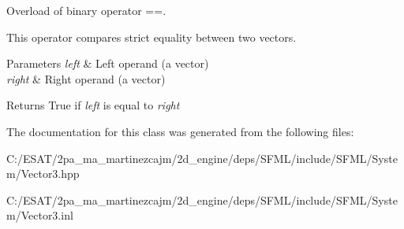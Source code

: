Overload of binary operator ==. 

This operator compares strict equality between two vectors.


\begin{DoxyParams}{Parameters}
{\em left} & Left operand (a vector) \\
\hline
{\em right} & Right operand (a vector)\\
\hline
\end{DoxyParams}
\begin{DoxyReturn}{Returns}
True if {\itshape left} is equal to {\itshape right} 
\end{DoxyReturn}


The documentation for this class was generated from the following files\+:\begin{DoxyCompactItemize}
\item 
C\+:/\+E\+S\+A\+T/2pa\+\_\+ma\+\_\+martinezcajm/2d\+\_\+engine/deps/\+S\+F\+M\+L/include/\+S\+F\+M\+L/\+System/Vector3.\+hpp\item 
C\+:/\+E\+S\+A\+T/2pa\+\_\+ma\+\_\+martinezcajm/2d\+\_\+engine/deps/\+S\+F\+M\+L/include/\+S\+F\+M\+L/\+System/Vector3.\+inl\end{DoxyCompactItemize}
